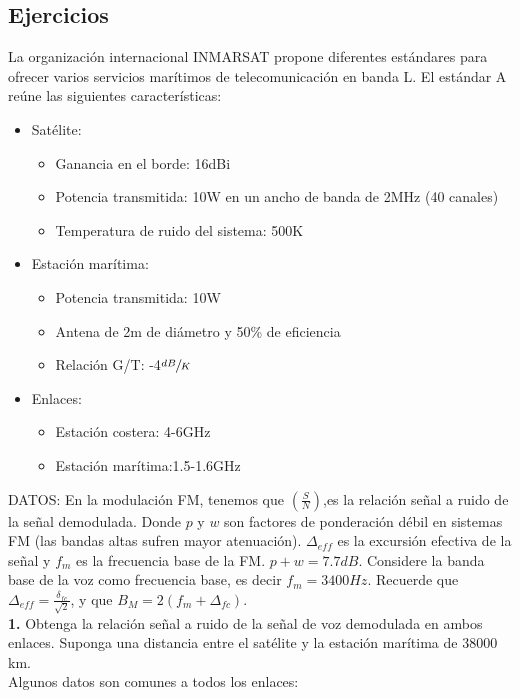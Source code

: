 \subsection{Ejercicios}
\label{sub:ejercicios5}
\begin{exercise}[1]
	La organización internacional INMARSAT propone diferentes estándares para ofrecer varios servicios marítimos de telecomunicación en banda L. El estándar A reúne las siguientes características:
	\begin{itemize}
		\item Satélite:
		\begin{itemize}
			\item Ganancia en el borde: 16dBi
			\item Potencia transmitida: 10W en un ancho de banda de 2MHz (40 canales)
			\item Temperatura de ruido del sistema: 500K
		\end{itemize}
		\item Estación marítima:
		\begin{itemize}
			\item Potencia transmitida: 10W
			\item Antena de 2m de diámetro y 50\% de eficiencia
			\item Relación G/T: -4$\sfrac{dB}{K}$
		\end{itemize}
		\item Enlaces:
		\begin{itemize}
			\item Estación costera: 4-6GHz
			\item Estación marítima:1.5-1.6GHz
		\end{itemize}
	\end{itemize} 
	DATOS: En la modulación FM, tenemos que $(\frac{S}{N})$,es la relación señal a ruido de la señal demodulada. Donde $p$ y $w$ son factores de ponderación débil en sistemas FM (las bandas altas sufren mayor atenuación). $\Delta_{eff}$ es la excursión efectiva de la señal y $f_m$ es la frecuencia base de la FM. $p+w=7.7dB$. Considere la banda base de la voz como frecuencia base, es decir $f_m=3400Hz$. Recuerde que $\Delta_{eff}=\frac{\delta_{fc}}{\sqrt{2}}$, y que $B_M=2(f_m+\Delta_{fc})$.\\
	\textbf{1.} Obtenga la relación señal a ruido de la señal de voz demodulada en ambos enlaces. Suponga una distancia entre el satélite y la estación marítima de 38000 km.\\
	Algunos datos son comunes a todos los enlaces:
	\begin{gather*}

\end{gather*}
\end{exercise}
